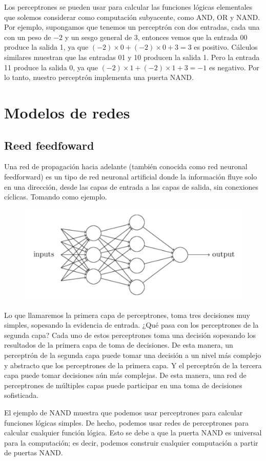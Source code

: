 Los perceptrones se pueden usar para calcular las funciones lógicas elementales que solemos considerar como computación subyacente, como AND, OR y NAND. Por ejemplo, supongamos que tenemos un perceptrón con dos entradas, cada una con un peso de $-2$ y un sesgo general de $3$, entonces vemos que la entrada $00$ produce la salida 1, ya que $(-2)\times 0 + (-2)\times 0 + 3 = 3$ es positivo. Cálculos similares muestran que las entradas 01 y 10 producen la salida 1. Pero la entrada 11 produce la salida 0, ya que $(-2)\times 1 + (-2)\times 1 + 3 = -1$ es negativo. Por lo tanto, nuestro perceptrón implementa una puerta NAND.

\section{Modelos de redes}

\subsection{Reed feedfoward}

Una red de propagación hacia adelante (también conocida como red neuronal feedforward) es un tipo de red neuronal artificial donde la información fluye solo en una dirección, desde las capas de entrada a las capas de salida, sin conexiones cíclicas. Tomando como ejemplo.
\begin{figure}[h!]
    \centering
    \includegraphics[width=0.5\linewidth]{imagen2.png}
\end{figure}
Lo que llamaremos la primera capa de perceptrones, toma tres decisiones muy simples, sopesando la evidencia de entrada. ¿Qué pasa con los perceptrones de la segunda capa? Cada uno de estos perceptrones toma una decisión sopesando los resultados de la primera capa de toma de decisiones. De esta manera, un perceptrón de la segunda capa puede tomar una decisión a un nivel más complejo y abstracto que los perceptrones de la primera capa. Y el perceptrón de la tercera capa puede tomar decisiones aún más complejas. De esta manera, una red de perceptrones de múltiples capas puede participar en una toma de decisiones sofisticada.

El ejemplo de NAND muestra que podemos usar perceptrones para calcular funciones lógicas simples. De hecho, podemos usar redes de perceptrones para calcular cualquier función lógica. Esto se debe a que la puerta NAND es universal para la computación; es decir, podemos construir cualquier computación a partir de puertas NAND.

